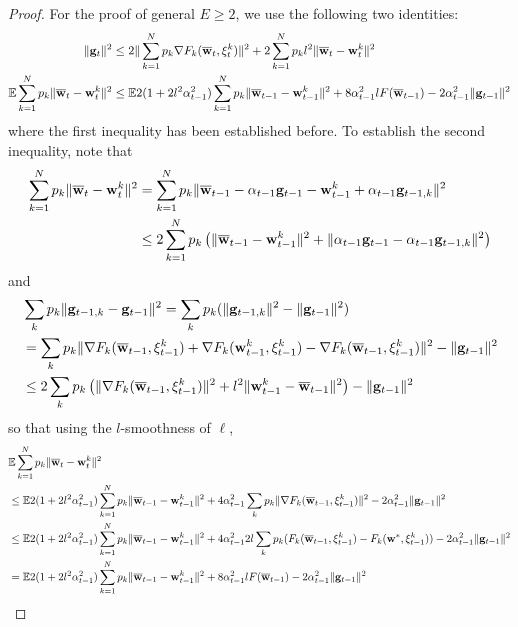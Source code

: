 \begin{proof}
	For the proof of general $E\ge2$, we use the following two identities:
	\begin{align*}
	\|{\mathbf{g}}_{t}\|^{2} & \leq2\|\sum_{k=1}^{N}p_{k}\nabla F_{k}({\overline{\mathbf{w}}}_{t},\xi_{t}^{k})\|^{2}+2\sum_{k=1}^{N}p_{k}l^{2}\|{\overline{\mathbf{w}}}_{t}-{\mathbf{w}}_{t}^{k}\|^{2}\\
	\mathbb{E}\sum_{k=1}^{N}p_{k}\|{\overline{\mathbf{w}}}_{t}-{\mathbf{w}}_{t}^{k}\|^{2} & \leq\mathbb{E}2(1+2l^{2}\alpha_{t-1}^{2})\sum_{k=1}^{N}p_{k}\|{\overline{\mathbf{w}}}_{t-1}-{\mathbf{w}}_{t-1}^{k}\|^{2}+8\alpha_{t-1}^{2}lF({\overline{\mathbf{w}}}_{t-1})-2\alpha_{t-1}^{2}\|{\mathbf{g}}_{t-1}\|^{2}
	\end{align*}
	where the first inequality has been established before. To establish
	the second inequality, note that 
	\begin{align*}
	\sum_{k=1}^{N}p_{k}\|{\overline{\mathbf{w}}}_{t}-{\mathbf{w}}_{t}^{k}\|^{2} & =\sum_{k=1}^{N}p_{k}\|{\overline{\mathbf{w}}}_{t-1}-\alpha_{t-1}{\mathbf{g}}_{t-1}-{\mathbf{w}}_{t-1}^{k}+\alpha_{t-1}{\mathbf{g}}_{t-1,k}\|^{2}\\
	& \leq2\sum_{k=1}^{N}p_{k}\left(\|{\overline{\mathbf{w}}}_{t-1}-{\mathbf{w}}_{t-1}^{k}\|^{2}+\|\alpha_{t-1}{\mathbf{g}}_{t-1}-\alpha_{t-1}{\mathbf{g}}_{t-1,k}\|^{2}\right)
	\end{align*}
	and
	\begin{align*}
	& \sum_{k}p_{k}\|{\mathbf{g}}_{t-1,k}-{\mathbf{g}}_{t-1}\|^{2}=\sum_{k}p_{k}(\|{\mathbf{g}}_{t-1,k}\|^{2}-\|{\mathbf{g}}_{t-1}\|^{2})\\
	& =\sum_{k}p_{k}\|\nabla F_{k}({\overline{\mathbf{w}}}_{t-1},\xi_{t-1}^{k})+\nabla F_{k}({\mathbf{w}}_{t-1}^{k},\xi_{t-1}^{k})-\nabla F_{k}({\overline{\mathbf{w}}}_{t-1},\xi_{t-1}^{k})\|^{2}-\|{\mathbf{g}}_{t-1}\|^{2}\\
	& \leq2\sum_{k}p_{k}\left(\|\nabla F_{k}({\overline{\mathbf{w}}}_{t-1},\xi_{t-1}^{k})\|^{2}+l^{2}\|{\mathbf{w}}_{t-1}^{k}-{\overline{\mathbf{w}}}_{t-1}\|^{2}\right)-\|{\mathbf{g}}_{t-1}\|^{2}
	\end{align*}
	so that using the $l$-smoothness of $\ell$, 
	\begin{align*}
	& \mathbb{E}\sum_{k=1}^{N}p_{k}\|{\overline{\mathbf{w}}}_{t}-{\mathbf{w}}_{t}^{k}\|^{2}\\
	& \leq\mathbb{E}2(1+2l^{2}\alpha_{t-1}^{2})\sum_{k=1}^{N}p_{k}\|{\overline{\mathbf{w}}}_{t-1}-{\mathbf{w}}_{t-1}^{k}\|^{2}+4\alpha_{t-1}^{2}\sum_{k}p_{k}\|\nabla F_{k}({\overline{\mathbf{w}}}_{t-1},\xi_{t-1}^{k})\|^{2}-2\alpha_{t-1}^{2}\|{\mathbf{g}}_{t-1}\|^{2}\\
	& \leq\mathbb{E}2(1+2l^{2}\alpha_{t-1}^{2})\sum_{k=1}^{N}p_{k}\|{\overline{\mathbf{w}}}_{t-1}-{\mathbf{w}}_{t-1}^{k}\|^{2}+4\alpha_{t-1}^{2}2l\sum_{k}p_{k}(F_{k}({\overline{\mathbf{w}}}_{t-1},\xi_{t-1}^{k})-F_{k}({\mathbf{w}}^{\ast},\xi_{t-1}^{k}))-2\alpha_{t-1}^{2}\|{\mathbf{g}}_{t-1}\|^{2}\\
	& =\mathbb{E}2(1+2l^{2}\alpha_{t-1}^{2})\sum_{k=1}^{N}p_{k}\|{\overline{\mathbf{w}}}_{t-1}-{\mathbf{w}}_{t-1}^{k}\|^{2}+8\alpha_{t-1}^{2}lF({\overline{\mathbf{w}}}_{t-1})-2\alpha_{t-1}^{2}\|{\mathbf{g}}_{t-1}\|^{2}
	\end{align*}
	

\end{proof}

